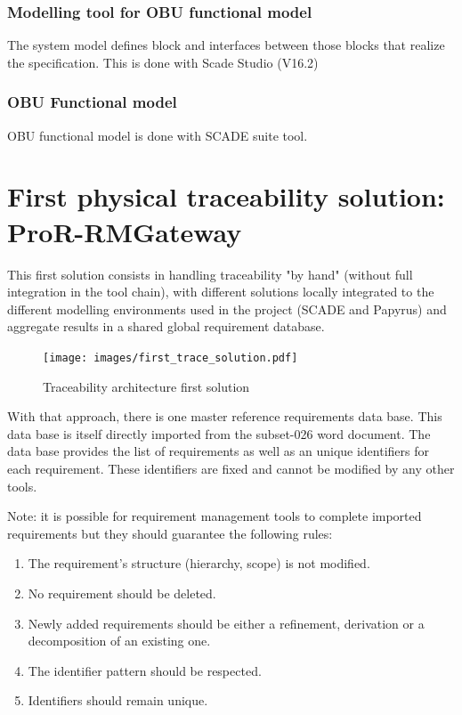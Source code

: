 \documentclass[11pt]{template/openetcs_report}
\begin{document}
\subsection{Modelling tool for OBU functional model}
The system model defines block and interfaces between those blocks that realize
the specification. This is done with Scade Studio (V16.2) 

\subsection{OBU Functional model}
\label{sec-10}
OBU functional model is done with SCADE suite tool.

\chapter{First physical traceability solution: ProR-RMGateway}
\label{sec-5}

This first solution consists in handling traceability "by hand" (without full integration in the tool chain), with different solutions locally integrated to the different modelling environments used in the project (SCADE and Papyrus) and aggregate results in a shared global requirement database.

\begin{figure}[htb]
\centering
\texttt{[image: images/first\_trace\_solution.pdf]}
\caption{\label{fig:trace_first}Traceability architecture first solution}
\end{figure}

With that approach, there is one master reference requirements data base. This data
base is itself directly imported from the subset-026 word document. The data
base provides the list of requirements as well as an unique identifiers for each
requirement. These identifiers are fixed and cannot be modified by any other
tools. 

Note: it is possible for requirement management tools to complete imported
requirements but they should guarantee the following rules:
\begin{enumerate}
\item The requirement's structure (hierarchy, scope) is not modified.
\item No requirement should be deleted.
\item Newly added requirements should be either a refinement, derivation or a decomposition of an existing one.
\item The identifier pattern should be respected.
\item Identifiers should remain unique.
\end{enumerate}
\end{document}
